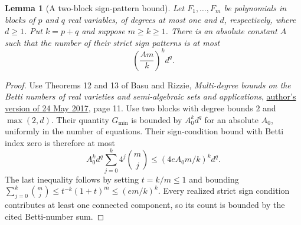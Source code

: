 \documentclass[11pt]{article}
\newtheorem{lemma}[theorem]{Lemma}
\begin{document}
\begin{lemma}[A two-block sign-pattern bound]\label{lem:count}
Let $F_1,\ldots,F_m$ be polynomials in blocks of $p$ and $q$ real
variables, of degrees at most one and $d$, respectively, where $d\ge1$.
Put $k=p+q$ and suppose $m\ge k\ge1$. There is an absolute constant
$A$ such that the number of their strict sign patterns is at most
\[
 \left(\frac{Am}{k}\right)^k d^q.
 \tag{5}
\]
\end{lemma}
\begin{proof}
Use Theorems 12 and 13 of Basu and Rizzie,
\emph{Multi-degree bounds on the Betti numbers of real varieties and
semi-algebraic sets and applications},
\href{https://www.math.purdue.edu/~sbasu/multidegree-may-24-2017.pdf}
{author's version of 24 May 2017}, page 11.
Use two blocks with degree bounds $2$ and $\max(2,d)$. Their quantity
$G_{\min}$ is bounded by $A_0^k d^q$ for an absolute $A_0$,
uniformly in the number of equations. Their sign-condition bound with
Betti index zero is therefore at most
\[
 A_0^k d^q\sum_{j=0}^k 4^j\binom mj
 \le (4eA_0m/k)^k d^q.
\]
The last inequality follows by setting $t=k/m\le1$ and bounding
$\sum_{j=0}^k\binom mj\le t^{-k}(1+t)^m\le(em/k)^k$.
Every realized strict sign condition contributes at least one connected
component, so its count is bounded by the cited Betti-number sum.
\end{proof}
\end{document}
